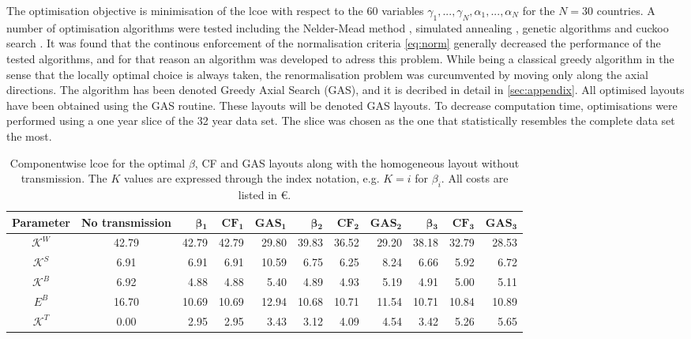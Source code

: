 \documentclass[a4paper, 5p, sort&compress]{elsarticle}%
\begin{document}
The optimisation objective is minimisation of the \gls{lcoe} with respect to the 60 variables
$\gamma_{1}, ..., \gamma_{N}, \alpha_{1}, ..., \alpha_{N}$
for the $N=30$
countries.  A number of optimisation algorithms were tested including the Nelder-Mead method
\cite{nelder}, simulated annealing \cite{sa}, genetic algorithms \cite{ga} and cuckoo search
\cite{cs}. It was found that the continous enforcement of the normalisation criteria
\cref{eq:norm} generally decreased the performance of the tested algorithms, and for that
reason an algorithm was developed to adress this problem. While being a classical greedy
algorithm in the sense that the locally optimal choice is always taken, the renormalisation
problem was curcumvented by moving only along the axial directions. The algorithm has been
denoted Greedy Axial Search (GAS), and it is decribed in detail in \cref{sec:appendix}. All
optimised layouts have been obtained using the GAS routine. These layouts will be denoted GAS
layouts. To decrease computation time, optimisations were performed using a one year slice of
the 32 year data set. The slice was chosen as the one that statistically resembles the complete
data set the most.

\begin{table}[t!]
  \centering
  \caption{Componentwise \gls{lcoe} for the optimal $\beta$, CF and GAS layouts along with the
    homogeneous layout without transmission. The $K$ values are expressed through the index
    notation, e.g. $K = i$ for $\beta_{i}$. All costs are listed in \euro.}
  \label{tab:cost}
  \begin{tabular}{ccrrrrrrrrr}
    \toprule
    \textbf{Parameter} & \textbf{No transmission} & $\boldsymbol\beta\mathbf{_{1}}$ & $\mathbf{CF_{1}}$ & $\mathbf{GAS_{1}}$ & $\boldsymbol\beta\mathbf{_{2}}$ & $\mathbf{CF_{2}}$& $\mathbf{GAS_{2}}$ & $\boldsymbol\beta\mathbf{_{3}}$ & $\mathbf{CF_{3}}$ & $\mathbf{GAS_{3}}$ \\
    \midrule
    $\mathcal{K}^{W}$ & 42.79 & 42.79 & 42.79 & 29.80 & 39.83 & 36.52 & 29.20 & 38.18 & 32.79 & 28.53 \\ %
    $\mathcal{K}^{S}$ & 6.91 & 6.91 & 6.91 & 10.59 & 6.75 & 6.25 & 8.24 & 6.66 & 5.92 & 6.72 \\ %
    $\mathcal{K}^{B}$ & 6.92 & 4.88 & 4.88 & 5.40 & 4.89 & 4.93 & 5.19 & 4.91 & 5.00 & 5.11 \\ %
    $E^{B}$ & 16.70 & 10.69 & 10.69 & 12.94 & 10.68 & 10.71 & 11.54 & 10.71 & 10.84 & 10.89 \\ %
    $\mathcal{K}^{T}$ & 0.00 & 2.95 & 2.95 & 3.43 & 3.12 & 4.09 & 4.54 & 3.42 & 5.26 & 5.65 \\ %
    \bottomrule
  \end{tabular}
\end{table}
\end{document}
